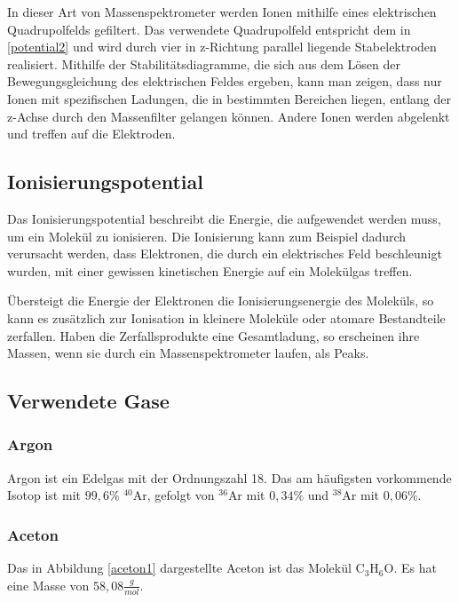 \documentclass[10pt,a4paper]{article}
\begin{document}
In dieser Art von Massenspektrometer werden Ionen mithilfe eines elektrischen Quadrupolfelds gefiltert. Das verwendete Quadrupolfeld entspricht dem in \eqref{potential2} und wird durch vier in z-Richtung parallel liegende Stabelektroden realisiert. Mithilfe der Stabilitätsdiagramme, die sich aus dem Lösen der Bewegungsgleichung des elektrischen Feldes ergeben, kann man zeigen, dass nur Ionen mit spezifischen Ladungen, die in bestimmten Bereichen liegen, entlang der z-Achse durch den Massenfilter gelangen können. Andere Ionen werden abgelenkt und treffen auf die Elektroden.

\subsection{Ionisierungspotential}

Das Ionisierungspotential beschreibt die Energie, die aufgewendet werden muss, um ein Molekül zu ionisieren. Die Ionisierung kann zum Beispiel dadurch verursacht werden, dass Elektronen, die durch ein elektrisches Feld beschleunigt wurden, mit einer gewissen kinetischen Energie auf ein Molekülgas treffen.

Übersteigt die Energie der Elektronen die Ionisierungsenergie des Moleküls, so kann es zusätzlich zur Ionisation in kleinere Moleküle oder atomare Bestandteile zerfallen. Haben die Zerfallsprodukte eine Gesamtladung, so erscheinen ihre Massen, wenn sie durch ein Massenspektrometer laufen, als Peaks. 

\subsection{Verwendete Gase}

\subsubsection{Argon}

Argon ist ein Edelgas mit der Ordnungszahl 18. Das am häufigsten vorkommende Isotop ist mit $99,6\%$ $^{40}$Ar, gefolgt von $^{36}$Ar mit $0,34\%$ und $^{38}$Ar mit $0,06\%$.

\subsubsection{Aceton}

Das in Abbildung \ref{aceton1} dargestellte Aceton ist das Molekül C$_3$H$_6$O. Es hat eine Masse von $58,08 \frac{g}{mol}$.
\end{document}
